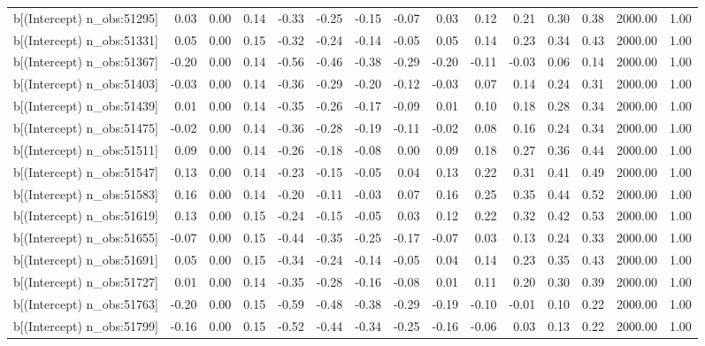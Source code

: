 \begin{table}[ht]
\begin{tabular}{rrrrrrrrrrrrrrr}
  b[(Intercept) n\_obs:51295] & 0.03 & 0.00 & 0.14 & -0.33 & -0.25 & -0.15 & -0.07 & 0.03 & 0.12 & 0.21 & 0.30 & 0.38 & 2000.00 & 1.00 \\ 
  b[(Intercept) n\_obs:51331] & 0.05 & 0.00 & 0.15 & -0.32 & -0.24 & -0.14 & -0.05 & 0.05 & 0.14 & 0.23 & 0.34 & 0.43 & 2000.00 & 1.00 \\ 
  b[(Intercept) n\_obs:51367] & -0.20 & 0.00 & 0.14 & -0.56 & -0.46 & -0.38 & -0.29 & -0.20 & -0.11 & -0.03 & 0.06 & 0.14 & 2000.00 & 1.00 \\ 
  b[(Intercept) n\_obs:51403] & -0.03 & 0.00 & 0.14 & -0.36 & -0.29 & -0.20 & -0.12 & -0.03 & 0.07 & 0.14 & 0.24 & 0.31 & 2000.00 & 1.00 \\ 
  b[(Intercept) n\_obs:51439] & 0.01 & 0.00 & 0.14 & -0.35 & -0.26 & -0.17 & -0.09 & 0.01 & 0.10 & 0.18 & 0.28 & 0.34 & 2000.00 & 1.00 \\ 
  b[(Intercept) n\_obs:51475] & -0.02 & 0.00 & 0.14 & -0.36 & -0.28 & -0.19 & -0.11 & -0.02 & 0.08 & 0.16 & 0.24 & 0.34 & 2000.00 & 1.00 \\ 
  b[(Intercept) n\_obs:51511] & 0.09 & 0.00 & 0.14 & -0.26 & -0.18 & -0.08 & 0.00 & 0.09 & 0.18 & 0.27 & 0.36 & 0.44 & 2000.00 & 1.00 \\ 
  b[(Intercept) n\_obs:51547] & 0.13 & 0.00 & 0.14 & -0.23 & -0.15 & -0.05 & 0.04 & 0.13 & 0.22 & 0.31 & 0.41 & 0.49 & 2000.00 & 1.00 \\ 
  b[(Intercept) n\_obs:51583] & 0.16 & 0.00 & 0.14 & -0.20 & -0.11 & -0.03 & 0.07 & 0.16 & 0.25 & 0.35 & 0.44 & 0.52 & 2000.00 & 1.00 \\ 
  b[(Intercept) n\_obs:51619] & 0.13 & 0.00 & 0.15 & -0.24 & -0.15 & -0.05 & 0.03 & 0.12 & 0.22 & 0.32 & 0.42 & 0.53 & 2000.00 & 1.00 \\ 
  b[(Intercept) n\_obs:51655] & -0.07 & 0.00 & 0.15 & -0.44 & -0.35 & -0.25 & -0.17 & -0.07 & 0.03 & 0.13 & 0.24 & 0.33 & 2000.00 & 1.00 \\ 
  b[(Intercept) n\_obs:51691] & 0.05 & 0.00 & 0.15 & -0.34 & -0.24 & -0.14 & -0.05 & 0.04 & 0.14 & 0.23 & 0.35 & 0.43 & 2000.00 & 1.00 \\ 
  b[(Intercept) n\_obs:51727] & 0.01 & 0.00 & 0.14 & -0.35 & -0.28 & -0.16 & -0.08 & 0.01 & 0.11 & 0.20 & 0.30 & 0.39 & 2000.00 & 1.00 \\ 
  b[(Intercept) n\_obs:51763] & -0.20 & 0.00 & 0.15 & -0.59 & -0.48 & -0.38 & -0.29 & -0.19 & -0.10 & -0.01 & 0.10 & 0.22 & 2000.00 & 1.00 \\ 
  b[(Intercept) n\_obs:51799] & -0.16 & 0.00 & 0.15 & -0.52 & -0.44 & -0.34 & -0.25 & -0.16 & -0.06 & 0.03 & 0.13 & 0.22 & 2000.00 & 1.00 \\ 

\end{tabular}
\end{table}
